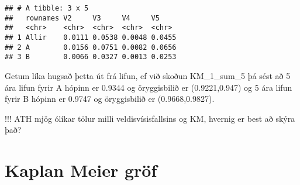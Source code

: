 \documentclass[
]{book}
\newenvironment{Shaded}{\begin{snugshade}}{\end{snugshade}}
\newcommand{\CommentTok}[1]{\textcolor[rgb]{0.56,0.35,0.01}{\textit{#1}}}
\newcommand{\DecValTok}[1]{\textcolor[rgb]{0.00,0.00,0.81}{#1}}
\newcommand{\KeywordTok}[1]{\textcolor[rgb]{0.13,0.29,0.53}{\textbf{#1}}}
\newcommand{\NormalTok}[1]{#1}
\newcommand{\StringTok}[1]{\textcolor[rgb]{0.31,0.60,0.02}{#1}}
\begin{document}
\begin{Shaded}
\end{Shaded}

\begin{verbatim}
## # A tibble: 3 x 5
##   rownames V2     V3     V4     V5    
##   <chr>    <chr>  <chr>  <chr>  <chr> 
## 1 Allir    0.0111 0.0538 0.0048 0.0455
## 2 A        0.0156 0.0751 0.0082 0.0656
## 3 B        0.0066 0.0327 0.0013 0.0253
\end{verbatim}

Getum líka hugsað þetta út frá lifun, ef við skoðun KM\_1\_sum\_5 þá sést að 5 ára lifun fyrir A hópinn er 0.9344 og öryggisbilið er (0.9221,0.947) og 5 ára lifun fyrir B hópinn er 0.9747 og öryggisbilið er (0.9668,0.9827).

!!! ATH mjög ólíkar tölur milli veldisvísisfallsins og KM, hvernig er best að skýra það?

\hypertarget{kaplan-meier-gruxf6f}{%
\section{Kaplan Meier gröf}\label{kaplan-meier-gruxf6f}}
\end{document}
